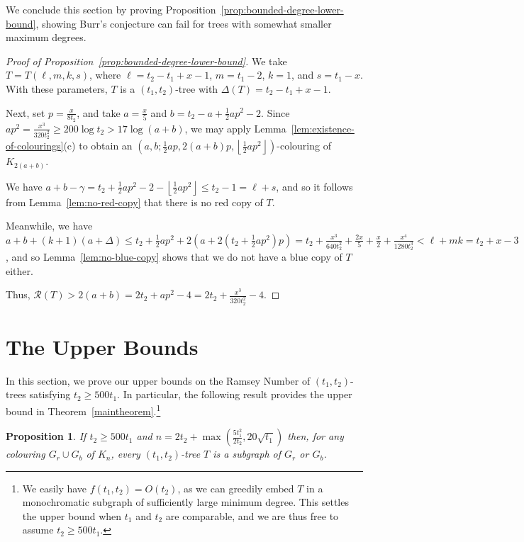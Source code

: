 \documentclass[11pt]{article}
\newtheorem{prop}[theorem]{Proposition}
\begin{document}
We conclude this section by proving Proposition~\ref{prop:bounded-degree-lower-bound}, showing Burr's conjecture can fail for trees with somewhat smaller maximum degrees.

\begin{proof}[Proof of Proposition~\ref{prop:bounded-degree-lower-bound}]
    We take $T = T(\ell, m, k, s)$, where $\ell = t_2 - t_1 + x - 1$, $m = t_1 - 2$, $k = 1$, and $s = t_1 - x$. With these parameters, $T$ is a $(t_1,t_2)$-tree with $\Delta(T) = t_2 - t_1 + x - 1$.

    Next, set $p = \frac{x}{8 t_2}$, and take $a = \frac{x}{5}$ and $b = t_2 - a + \frac12ap^2 - 2$. Since $ap^2 = \frac{x^3}{320t_2^2} \ge 200 \log t_2 > 17\log (a + b)$, we may apply Lemma~\ref{lem:existence-of-colourings}(c) to obtain an $(a,b; \frac12ap, 2(a+b)p, \left \lfloor \frac12ap^2 \right \rfloor)$-colouring of $K_{2(a+b)}$.

    We have $a + b - \gamma = t_2 + \frac12 a p^2 - 2 - \left \lfloor \frac12 ap^2 \right \rfloor \le t_2 - 1 = \ell + s$, and so it follows from Lemma~\ref{lem:no-red-copy} that there is no red copy of $T$.

    Meanwhile, we have $a + b + (k+1)(a + \Delta) \le t_2 + \frac12 ap^2 + 2 \left( a + 2(t_2 + \frac12 ap^2)p \right) = t_2 + \frac{x^3}{640 t_2^2} + \frac{2x}{5} + \frac{x}{2} + \frac{x^4}{1280t_2^3} < \ell + mk = t_2 + x - 3$, and so Lemma~\ref{lem:no-blue-copy} shows that we do not have a blue copy of $T$ either.

    Thus, $\mathcal{R}(T) > 2(a + b) = 2 t_2 + ap^2 - 4 = 2t_2 + \frac{x^3}{320 t_2^2} - 4$. 
\end{proof}


\section{The Upper Bounds}
\label{secub} 
In this section, we prove our upper bounds on the Ramsey Number of $(t_1,t_2)$-trees satisfying
$t_2 \ge 500t_1$. In particular, the following result provides the upper  bound in Theorem~\ref{maintheorem}.\footnote{We easily have $f(t_1, t_2) = O(t_2)$, as we can greedily embed $T$ in a monochromatic subgraph of sufficiently large minimum degree. This settles the upper bound when $t_1$ and $t_2$ are comparable, and we are thus free to assume $t_2 \ge 500 t_1$.}

\begin{prop}\label{mainlem}
If   $t_2 \ge 500t_1$ and $n=2t_2 + \max\left(\frac{5t_1^2}{2t_2}, 20\sqrt{t_1}\right)$  then, for any colouring $G_r\cup G_b$ of $K_n$, every $(t_1,t_2)$-tree $T$ is a subgraph of $G_r$ or $G_b$. 
\end{prop}
\end{document}
